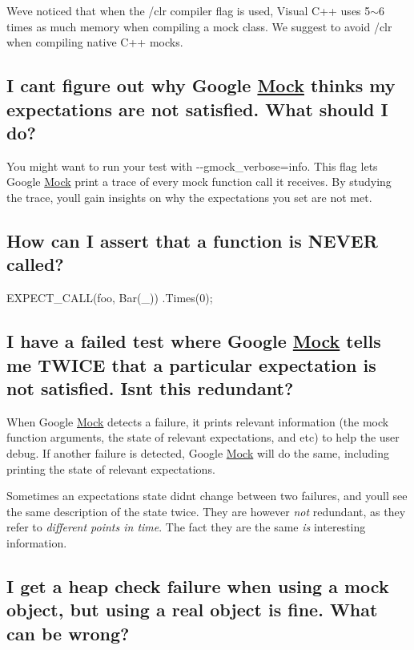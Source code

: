 We\textquotesingle{}ve noticed that when the {\ttfamily /clr} compiler flag is used, Visual C++ uses 5$\sim$6 times as much memory when compiling a mock class. We suggest to avoid {\ttfamily /clr} when compiling native C++ mocks.

\subsection*{I can\textquotesingle{}t figure out why Google \hyperlink{classMock}{Mock} thinks my expectations are not satisfied. What should I do?}

You might want to run your test with {\ttfamily -\/-\/gmock\+\_\+verbose=info}. This flag lets Google \hyperlink{classMock}{Mock} print a trace of every mock function call it receives. By studying the trace, you\textquotesingle{}ll gain insights on why the expectations you set are not met.

\subsection*{How can I assert that a function is N\+E\+V\+ER called?}


\begin{DoxyCode}
EXPECT\_CALL(foo, Bar(\_))
    .Times(0);
\end{DoxyCode}


\subsection*{I have a failed test where Google \hyperlink{classMock}{Mock} tells me T\+W\+I\+CE that a particular expectation is not satisfied. Isn\textquotesingle{}t this redundant?}

When Google \hyperlink{classMock}{Mock} detects a failure, it prints relevant information (the mock function arguments, the state of relevant expectations, and etc) to help the user debug. If another failure is detected, Google \hyperlink{classMock}{Mock} will do the same, including printing the state of relevant expectations.

Sometimes an expectation\textquotesingle{}s state didn\textquotesingle{}t change between two failures, and you\textquotesingle{}ll see the same description of the state twice. They are however {\itshape not} redundant, as they refer to {\itshape different points in time}. The fact they are the same {\itshape is} interesting information.

\subsection*{I get a heap check failure when using a mock object, but using a real object is fine. What can be wrong?}

